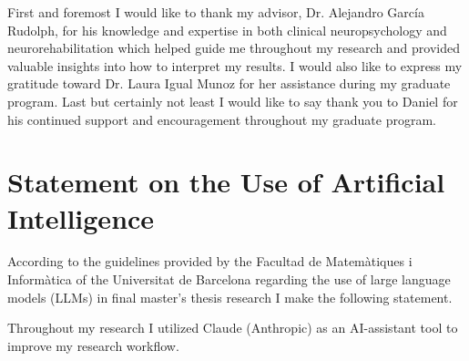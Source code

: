 \documentclass[
11pt, %
english, %
onehalfspacing, %
headsepline, %
]{MastersDoctoralThesis} %
\begin{document}
\begin{abstract}[]
Therefore, we have shown there to be evidence supporting replicable grouping of cognitive test results based on certain assumptions regarding representation and imputation. However, it cannot be concluded that these groupings represent separate clinical phenotypes or could be used for treatment purposes. Additional independent measures of outcomes and additional samples from external cohorts will need to occur before clinical use. CogDash presents both analysis designs for research, with the analysis code available at \url{https://github.com/zkunos/thesis_project}.
\end{abstract}


\begin{acknowledgements}
First and foremost I would like to thank my advisor, Dr. Alejandro García Rudolph, for his knowledge and expertise in both clinical neuropsychology and neurorehabilitation which helped guide me throughout my research and provided valuable insights into how to interpret my results. I would also like to express my gratitude toward Dr. Laura Igual Munoz for her assistance during my graduate program. Last but certainly not least I would like to say thank you to Daniel for his continued support and encouragement throughout my graduate program.
\end{acknowledgements}


\newpage
\chapter*{Statement on the Use of Artificial Intelligence}
According to the guidelines provided by the Facultad de Matemàtiques i Informàtica of the Universitat de Barcelona regarding the use of large language models (LLMs) in final master's thesis research I make the following statement.



Throughout my research I utilized Claude (Anthropic) as an AI-assistant tool to improve my research workflow.
\end{document}
